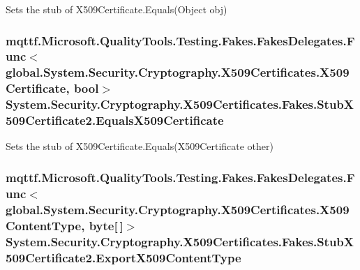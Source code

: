 Sets the stub of X509\-Certificate.\-Equals(\-Object obj)

\hypertarget{class_system_1_1_security_1_1_cryptography_1_1_x509_certificates_1_1_fakes_1_1_stub_x509_certificate2_a5fa3b993e181678b6fc55b590d2dec1c}{
\subsubsection[{Equals\-X509\-Certificate}]{\setlength{\rightskip}{0pt plus 5cm}mqttf.\-Microsoft.\-Quality\-Tools.\-Testing.\-Fakes.\-Fakes\-Delegates.\-Func$<$global.\-System.\-Security.\-Cryptography.\-X509\-Certificates.\-X509\-Certificate, bool$>$ System.\-Security.\-Cryptography.\-X509\-Certificates.\-Fakes.\-Stub\-X509\-Certificate2.\-Equals\-X509\-Certificate}}\label{class_system_1_1_security_1_1_cryptography_1_1_x509_certificates_1_1_fakes_1_1_stub_x509_certificate2_a5fa3b993e181678b6fc55b590d2dec1c}


Sets the stub of X509\-Certificate.\-Equals(\-X509\-Certificate other)

\hypertarget{class_system_1_1_security_1_1_cryptography_1_1_x509_certificates_1_1_fakes_1_1_stub_x509_certificate2_a8de8738efdecae40a1390226d0917726}{
\subsubsection[{Export\-X509\-Content\-Type}]{\setlength{\rightskip}{0pt plus 5cm}mqttf.\-Microsoft.\-Quality\-Tools.\-Testing.\-Fakes.\-Fakes\-Delegates.\-Func$<$global.\-System.\-Security.\-Cryptography.\-X509\-Certificates.\-X509\-Content\-Type, byte\mbox{[}$\,$\mbox{]}$>$ System.\-Security.\-Cryptography.\-X509\-Certificates.\-Fakes.\-Stub\-X509\-Certificate2.\-Export\-X509\-Content\-Type}}\label{class_system_1_1_security_1_1_cryptography_1_1_x509_certificates_1_1_fakes_1_1_stub_x509_certificate2_a8de8738efdecae40a1390226d0917726}


